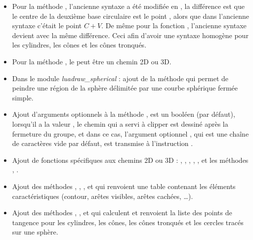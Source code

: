 \begin{itemize}
    \item Pour la méthode , l'ancienne syntaxe  a été modifiée en , la différence est que le centre de la deuxième base circulaire est le point , alors que dans l'ancienne syntaxe c'était le point $C+V$. De même pour la fonction , l'ancienne syntaxe  devient  avec la même différence. Ceci afin d'avoir une syntaxe homogène pour les cylindres, les cônes et les cônes tronqués.

    \item Pour la méthode , le  peut être un chemin 2D ou 3D.
    
    \item Dans le module \emph{luadraw\_spherical} : ajout de la méthode  qui permet de peindre une région de la sphère délimitée par une courbe sphérique fermée simple.

    \item Ajout d'arguments optionnels à la méthode ,  est un booléen (\false par défaut), lorsqu'il a la valeur \true, le chemin qui a servi à clipper est dessiné après la fermeture du groupe, et dans ce cas, l'argument optionnel , qui est une chaîne de caractères vide par défaut, est transmise à l'instruction \drawcmd.

    \item Ajout de fonctions spécifiques aux chemins 2D ou 3D : , , , , , et les méthodes , .
    
    \item Ajout des méthodes , , , et  qui renvoient une table contenant les éléments caractéristiques (contour, arêtes visibles, arêtes cachées, \ldots).

    \item Ajout des méthodes , ,  et  qui calculent et renvoient la liste des points de tangence pour les cylindres, les cônes, les cônes tronqués et les cercles tracés sur une sphère.


\end{itemize}
